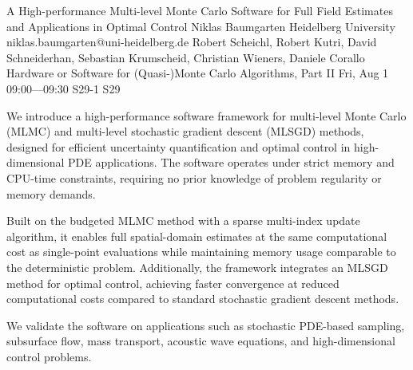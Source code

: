 \begin{talk}
  {A High-performance Multi-level Monte Carlo Software for Full Field Estimates and Applications in Optimal Control}%
  {Niklas Baumgarten}%
  {Heidelberg University}%
  {niklas.baumgarten@uni-heidelberg.de}%
  {Robert Scheichl, Robert Kutri, David Schneiderhan, Sebastian Krumscheid, Christian Wieners, Daniele Corallo}%
  {Hardware or Software for (Quasi-)Monte Carlo Algorithms, Part II}%
  {Fri, Aug 1 09:00---09:30}%
  {S29-1}%
  {S29}%


We introduce a high-performance software framework for multi-level Monte Carlo (MLMC)
and multi-level stochastic gradient descent (MLSGD) methods,
designed for efficient uncertainty quantification and optimal control in high-dimensional PDE applications.
The software operates under strict memory and CPU-time constraints,
requiring no prior knowledge of problem regularity or memory demands.

Built on the budgeted MLMC method with a sparse multi-index update algorithm,
it enables full spatial-domain estimates at the same computational cost as single-point
evaluations while maintaining memory usage comparable to the deterministic problem.
Additionally, the framework integrates an MLSGD method for optimal control,
achieving faster convergence at reduced computational costs compared to standard
stochastic gradient descent methods.

We validate the software on applications such as stochastic PDE-based sampling, subsurface flow,
mass transport, acoustic wave equations, and high-dimensional control problems.


\end{talk}


